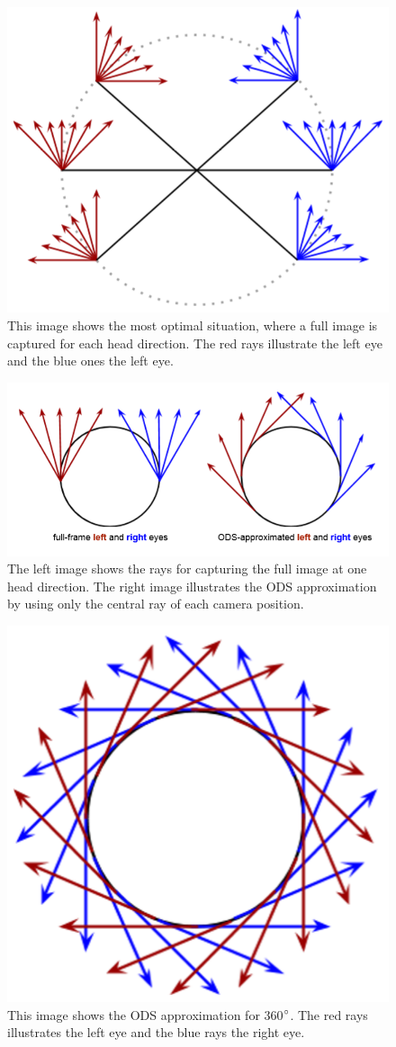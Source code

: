 \documentclass[10pt,twocolumn,letterpaper]{article}
\begin{document}
\begin{figure}[t]
\begin{center}
   \includegraphics[width=0.5\linewidth]{pictures/wanted.png}
\end{center}
   \caption{This image shows the most optimal situation, where a full image is captured for each head direction. The red rays illustrate the left eye and the blue ones the left eye.}
\label{wanted}
\end{figure}

\begin{figure}[t]
\begin{center}
	\includegraphics[width=0.8\linewidth]{pictures/approxi.png}
\end{center}
   \caption{The left image shows the rays for capturing the full image at one head direction. The right image illustrates the ODS approximation by using only the central ray of each camera position.}
\label{approx}
\end{figure}

\begin{figure}[t]
\begin{center}
   \includegraphics[width=0.5\linewidth]{pictures/ods.png}
\end{center}
   \caption{This image shows the ODS approximation for 360$\degree$. The red rays illustrates the left eye and the blue rays the right eye.}
\label{ods}
\end{figure}
\end{document}

